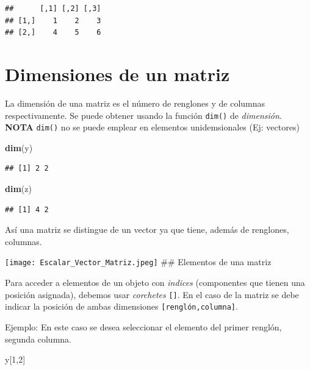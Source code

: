 \documentclass[
]{book}
\newenvironment{Shaded}{\begin{snugshade}}{\end{snugshade}}
\newcommand{\DecValTok}[1]{\textcolor[rgb]{0.00,0.00,0.81}{#1}}
\newcommand{\FunctionTok}[1]{\textcolor[rgb]{0.13,0.29,0.53}{\textbf{#1}}}
\newcommand{\NormalTok}[1]{#1}
\begin{document}
\begin{verbatim}
##      [,1] [,2] [,3]
## [1,]    1    2    3
## [2,]    4    5    6
\end{verbatim}

\section{Dimensiones de un matriz}\label{dimensiones-de-un-matriz}

La dimensión de una matriz es el número de renglones y de columnas respectivamente. Se puede obtener usando la función \texttt{dim()} de \emph{dimensión}.
\textbf{NOTA}
\texttt{dim()} no se puede emplear en elementos unidemsionales (Ej: vectores)

\begin{Shaded}
\begin{Highlighting}[]
\FunctionTok{dim}\NormalTok{(y)}
\end{Highlighting}
\end{Shaded}

\begin{verbatim}
## [1] 2 2
\end{verbatim}

\begin{Shaded}
\begin{Highlighting}[]
\FunctionTok{dim}\NormalTok{(z)}
\end{Highlighting}
\end{Shaded}

\begin{verbatim}
## [1] 4 2
\end{verbatim}

Así una matriz se distingue de un vector ya que tiene, además de renglones, columnas.

\texttt{[image: Escalar\_Vector\_Matriz.jpeg]}
\#\# Elementos de una matriz

Para acceder a elementos de un objeto con \emph{indices} (componentes que tienen una posición asignada), debemos usar \emph{corchetes} \texttt{{[}{]}}. En el caso de la matriz se debe indicar la posición de ambas dimensiones \texttt{{[}renglón,columna{]}}.

Ejemplo: En este caso se desea seleccionar el elemento del primer renglón, segunda columna.

\begin{Shaded}
\begin{Highlighting}[]
\NormalTok{y[}\DecValTok{1}\NormalTok{,}\DecValTok{2}\NormalTok{]}
\end{Highlighting}
\end{Shaded}
\end{document}
